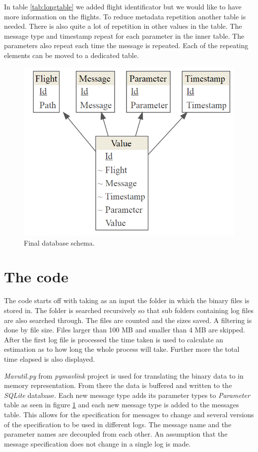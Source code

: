 \documentclass[12pt,oneside]{reedthesis}
\theoremstyle{definition}
\theoremstyle{definition}
\theoremstyle{definition}
\theoremstyle{remark}
\begin{document}
In table \ref{tab:longtable} we added flight identificator but we would
like to have more information on the flights. To reduce metadata
repetition another table is needed. There is also quite a lot of
repetition in other values in the table. The message type and timestamp
repeat for each parameter in the inner table. The parameters also repeat
each time the message is repeated. Each of the repeating elements can be
moved to a dedicated table.
\begin{figure}
\centering
\includegraphics{./figure/databaseSchema.PNG}
\caption{\label{fig:database}Final database schema.}
\end{figure}
\section{The code}\label{the-code}

The code starts off with taking as an input the folder in which the
binary files is stored in. The folder is searched recursively so that
sub folders containing log files are also searched through. The files
are counted and the sizes saved. A filtering is done by file size. Files
larger than 100 MB and smaller than 4 MB are skipped. After the first
log file is processed the time taken is used to calculate an estimation
as to how long the whole process will take. Further more the total time
elapsed is also displayed.

\emph{Mavutil.py} from \emph{pymavlink} project is used for translating
the binary data to in memory representation. From there the data is
buffered and written to the \emph{SQLite} database. Each new message
type adds its parameter types to \emph{Parameter} table as seen in
figure \ref{fig:database} and each new message type is added to the
messages table. This allows for the specification for messages to change
and several versions of the specification to be used in different logs.
The message name and the parameter names are decoupled from each other.
An assumption that the message specification does not change in a single
log is made.
\end{document}
